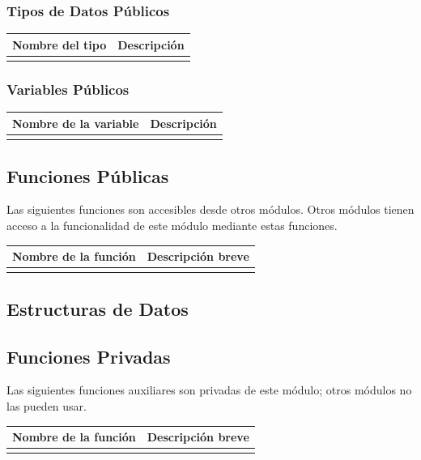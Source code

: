 \documentclass[a4paper,10pt]{article}
\begin{document}
\subsubsection{Tipos de Datos Públicos}
\begin{tabular}{| p{30mm} | p{10cm} |}
        \hline
        \textbf{Nombre del \mbox{tipo}} & \textbf{Descripción} \\
        \hline
         & \\
        \hline
\end{tabular}
\subsubsection{Variables Públicos}
\begin{tabular}{| p{30mm} | p{10cm} |}
        \hline
        \textbf{Nombre de la \mbox{variable}} & \textbf{Descripción} \\
        \hline
         & \\
        \hline
\end{tabular}
\subsection{Funciones Públicas}
Las siguientes funciones son accesibles desde otros módulos. Otros módulos
tienen acceso a la funcionalidad de este módulo mediante estas funciones.
~\\

\begin{tabular}{| p{30mm} | p{10cm} |}
        \hline
        \textbf{Nombre de la \mbox{función}} & \textbf{Descripción breve} \\
        \hline
         & \\
        \hline
\end{tabular}
\subsection{Estructuras de Datos}
\subsection{Funciones Privadas}
Las siguientes funciones auxiliares son privadas de este módulo; otros módulos
no las pueden usar.
~\\

\begin{tabular}{| p{30mm} | p{10cm} |}
        \hline
        \textbf{Nombre de la \mbox{función}} & \textbf{Descripción breve} \\
        \hline
         & \\
        \hline
\end{tabular}
\end{document}
